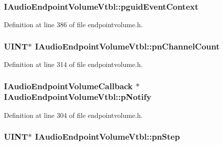 \subsubsection[{\texorpdfstring{pguid\+Event\+Context}{pguidEventContext}}]{ I\+Audio\+Endpoint\+Volume\+Vtbl\+::pguid\+Event\+Context}\hypertarget{struct_i_audio_endpoint_volume_vtbl_a4645719eaa744e0ac977f788626cc4cc}{}\label{struct_i_audio_endpoint_volume_vtbl_a4645719eaa744e0ac977f788626cc4cc}


Definition at line 386 of file endpointvolume.\+h.

\subsubsection[{\texorpdfstring{pn\+Channel\+Count}{pnChannelCount}}]{ {\bf U\+I\+NT}$\ast$ I\+Audio\+Endpoint\+Volume\+Vtbl\+::pn\+Channel\+Count}\hypertarget{struct_i_audio_endpoint_volume_vtbl_a4ab4670f69078f77e5f57ba689ed2620}{}\label{struct_i_audio_endpoint_volume_vtbl_a4ab4670f69078f77e5f57ba689ed2620}


Definition at line 314 of file endpointvolume.\+h.

\subsubsection[{\texorpdfstring{p\+Notify}{pNotify}}]{ {\bf I\+Audio\+Endpoint\+Volume\+Callback} $\ast$ I\+Audio\+Endpoint\+Volume\+Vtbl\+::p\+Notify}\hypertarget{struct_i_audio_endpoint_volume_vtbl_aa1de71932e61ca7c521fef7a8b0f4e27}{}\label{struct_i_audio_endpoint_volume_vtbl_aa1de71932e61ca7c521fef7a8b0f4e27}


Definition at line 304 of file endpointvolume.\+h.

\subsubsection[{\texorpdfstring{pn\+Step}{pnStep}}]{ {\bf U\+I\+NT}$\ast$ I\+Audio\+Endpoint\+Volume\+Vtbl\+::pn\+Step}\hypertarget{struct_i_audio_endpoint_volume_vtbl_a1fabbd09095379b4ad4e7e18e411f6bd}{}\label{struct_i_audio_endpoint_volume_vtbl_a1fabbd09095379b4ad4e7e18e411f6bd}


